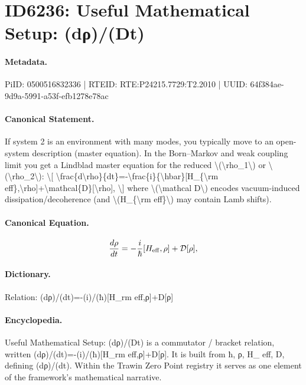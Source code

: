 \section*{ID6236: Useful Mathematical Setup: (dρ)/(Dt)}
\paragraph{Metadata.}
PiID: 0500516832336 | RTEID: RTE:P24215.7729:T2.2010 | UUID: 64f384ae-9d9a-5991-a53f-efb1278e78ac

\paragraph{Canonical Statement.}
If system 2 is an environment with many modes, you typically move to an open-system description (master equation). In the Born–Markov and weak coupling limit you get a Lindblad master equation for the reduced \textbackslash{}(\textbackslash{}rho\_1\textbackslash{}) or \textbackslash{}(\textbackslash{}rho\_2\textbackslash{}): \textbackslash{}[ \textbackslash{}frac\{d\textbackslash{}rho\}\{dt\}=-\textbackslash{}frac\{i\}\{\textbackslash{}hbar\}[H\_\{\textbackslash{}rm eff\},\textbackslash{}rho]+\textbackslash{}mathcal\{D\}[\textbackslash{}rho], \textbackslash{}] where \textbackslash{}(\textbackslash{}mathcal D\textbackslash{}) encodes vacuum-induced dissipation/decoherence (and \textbackslash{}(H\_\{\textbackslash{}rm eff\}\textbackslash{}) may contain Lamb shifts).

\paragraph{Canonical Equation.}
\[
\frac{d\rho}{dt}=-\frac{i}{\hbar}[H_{\rm eff},\rho]+\mathcal{D}[\rho],
\]

\paragraph{Dictionary.}
Relation: (dρ)/(dt)=-(i)/(ħ)[H\_rm eff,ρ]+D[ρ]

\paragraph{Encyclopedia.}
Useful Mathematical Setup: (dρ)/(Dt) is a commutator / bracket relation, written (dρ)/(dt)=-(i)/(ħ)[H\_rm eff,ρ]+D[ρ]. It is built from ħ, ρ, H\_ eff, D, defining (dρ)/(dt). Within the Trawin Zero Point registry it serves as one element of the framework's mathematical narrative.
